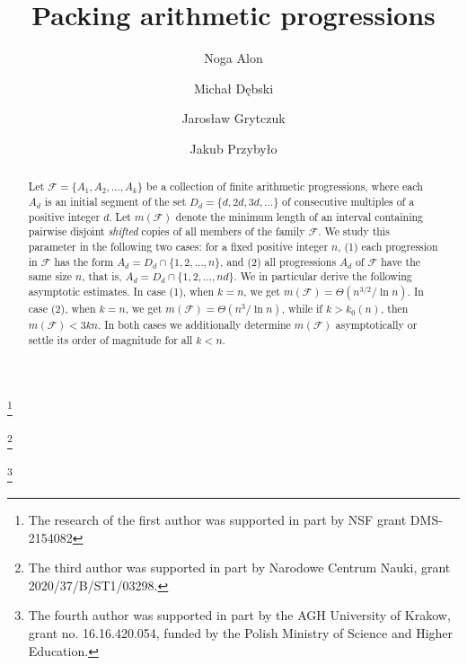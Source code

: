 \documentclass[12pt]{amsart}
\theoremstyle{plain}
\numberwithin{equation}{section}
\begin{document}
	\title{Packing arithmetic progressions}
	
	\author{Noga Alon}
	\address{Department of Mathematics, Princeton University, Princeton, NJ 08544, USA and Schools of Mathematics and Computer Science, Tel Aviv University, Tel Aviv 69978, Israel}
	\thanks{The research of the first author was supported in part by NSF grant DMS-2154082}
	
	\author{Micha{\l} D\k ebski}
	\address{Faculty of Mathematics and Information Science, Warsaw University
		of Technology, 00-662 Warsaw, Poland}
	
	\author{Jaros\l aw Grytczuk}
	\address{Faculty of Mathematics and Information Science, Warsaw University
		of Technology, 00-662 Warsaw, Poland}
	\thanks{The third author was supported in part by Narodowe Centrum Nauki, grant 2020/37/B/ST1/03298.}
		
	\author{Jakub Przyby\l o}
	\address{AGH University of Krakow, al. A. Mickiewicza 30, 30-059 Krakow, Poland}
	\thanks{The fourth author was supported in part by the AGH University of Krakow, grant no. 16.16.420.054, funded by the Polish Ministry of Science and Higher Education.}


\begin{abstract}
	Let $\mathcal{F}=\{A_1,A_2,\ldots,A_k\}$ be a collection of finite arithmetic progressions, where each $A_d$ is an initial segment of the set $D_d=\{d,2d,3d,\ldots\}$ of consecutive multiples of a positive integer $d$. Let $m(\mathcal{F})$ denote the minimum length of an interval containing pairwise disjoint \emph{shifted} copies of all members of the family $\mathcal{F}$. 
	We study this parameter in the following two cases: for a fixed positive integer $n$, (1) each progression in $\mathcal{F}$ has the form $A_d=D_d\cap\{1,2,\ldots,n\}$, and (2) all progressions $A_d$ of $\mathcal{F}$ have the same size $n$, that is, $A_d=D_d\cap \{1,2,\ldots, nd\}$. We in particular derive the following asymptotic estimates. In case (1), when $k=n$, we get $m(\mathcal{F})=\Theta(n^{3/2}/\ln n)$. In case (2), when $k=n$, we get $m(\mathcal{F})=\Theta(n^3/\ln n)$, while if $k>k_0(n)$, then $m(\mathcal{F}) < 3kn$. In both cases we additionally determine $m(\mathcal{F})$ asymptotically or settle its order of magnitude for all $k<n$.
\end{abstract}

	\maketitle
	
\end{document}
